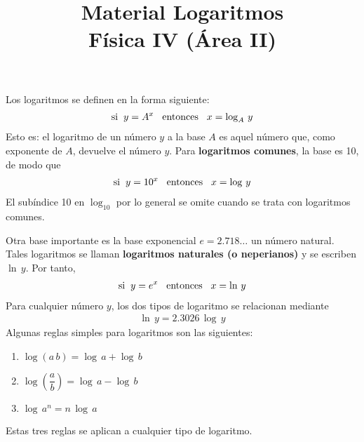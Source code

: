 \documentclass[14pt]{extarticle}
\title{\vspace*{-2cm} Material Logaritmos \\ \large{Física IV (Área II)} \vspace{-5ex}}
\date{}
\begin{document}
\maketitle

Los logaritmos se definen en la forma siguiente:
\begin{align*}
\text{si} \hspace{0.2cm} y = A^{x} \hspace{0.3cm} \text{entonces} \hspace{0.3cm} x = \log_{A} \, y
\end{align*}
Esto es: el logaritmo de un número $y$ a la base $A$ es aquel número que, como exponente de $A$, devuelve el número $y$. Para \textbf{logaritmos comunes}, la base es \num{10}, de modo que
\begin{align*}
\text{si} \hspace{0.2cm} y = 10^{x} \hspace{0.3cm} \text{entonces} \hspace{0.3cm} x = \log \, y
\end{align*}
El subíndice \num{10} en $\log_{10}$ por lo general se omite cuando se trata con logaritmos comunes.
\par
Otra base importante es la base exponencial $e = 2.718 \dots$ un número natural. Tales logaritmos se llaman \textbf{logaritmos naturales (o neperianos)} y se escriben $\ln \, y$. Por tanto,
\begin{align*}
\text{si} \hspace{0.2cm} y = e^{x} \hspace{0.3cm} \text{entonces} \hspace{0.3cm} x = \ln \, y
\end{align*}
Para cualquier número $y$, los dos tipos de logaritmo se relacionan mediante
\begin{align*}
\ln \, y = 2.3026 \, \log \, y
\end{align*}
Algunas reglas simples para logaritmos son las siguientes:
\begin{enumerate}
\item $\log (a \, b) = \log \, a + \log \, b$ 
\item $\log \left( \dfrac{a}{b} \right) = \log \, a - \log \, b$
\item $\log \, a^{n} = n \, \log \, a$
\end{enumerate}
Estas tres reglas se aplican a cualquier tipo de logaritmo.
\end{document}

